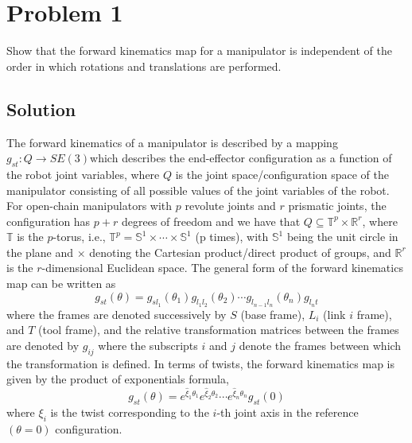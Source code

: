 \section*{Problem 1}
\setcounter{section}{1}
\setcounter{equation}{0}

Show that the forward kinematics map for a manipulator is independent of the order in which rotations and translations are performed.

\subsection*{Solution}

The forward kinematics of a manipulator is described by a mapping \( g_{st} : Q \to SE (3) \)which describes the end-eﬀector configuration as a function of the robot joint variables, where \( Q \) is the joint space/configuration space of the manipulator consisting of all possible values of the joint variables of the robot.
For open-chain manipulators with \( p \) revolute joints and \( r \) prismatic joints, the configuration has \( p+r \) degrees of freedom and we have that \( Q \subseteq \mathbb{T}^{p} \times \mathbb{R}^{r} \), where \( \mathbb{T} \) is the \(p\)-torus, i.e., \( \mathbb{T}^{p} = \mathbb{S}^{1} \times \cdots \times \mathbb{S}^{1} \) (p times), with \( \mathbb{S}^{1} \) being the unit circle in the plane and \( \times \) denoting the Cartesian product/direct product of groups, and \( \mathbb{R}^{r} \) is the \(r\)-dimensional Euclidean space.
The general form of the forward kinematics map can be written as
\begin{equation}
    g_{st}(\theta)
    =
    g_{s l_1}(\theta_1)
    g_{l_1 l_2}(\theta_2)
    \cdots
    g_{l_{n-1} l_n}(\theta_n)
    g_{l_n t}
\end{equation}
where the frames are denoted successively by \( S \) (base frame), \( L_i \) (link \(i\) frame), and \( T \) (tool frame), and the relative transformation matrices between the frames are denoted by \( g_{ij} \) where the subscripts \( i \) and \( j \) denote the frames between which the transformation is defined.
In terms of twists, the forward kinematics map is given by the product of exponentials formula,
\begin{equation}
    g_{st}(\theta)
    =
    e^{\widehat{\xi}_1 \theta_1}
    e^{\widehat{\xi}_2 \theta_2}
    \cdots
    e^{\widehat{\xi}_n \theta_n}
    g_{st}(0)
\end{equation}
where \( \xi_{i} \) is the twist corresponding to the \(i\)-th joint axis in the reference \( (\theta = 0) \) conﬁguration.

